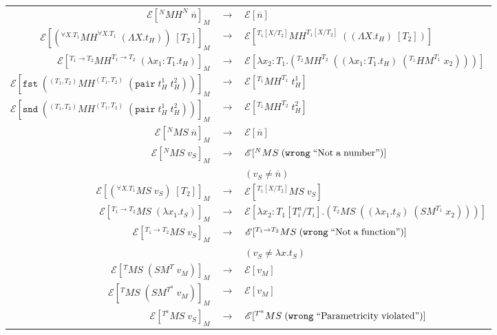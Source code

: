 \begin{figure}
\onehalfspacing
\begin{center}
\begin{tabular}{rcl}
$\mathscr{E}[^{N}MH^{N}\;\overline{n}]_{M}$ & $\rightarrow$ & $\mathscr{E}[\overline{n}]$ \\
$\mathscr{E}[(^{\forall X.T_{1}}MH^{\forall X.T_{1}}\;(\Lambda X.t_{H}))\;[T_{2}]]_{M}$ & $\rightarrow$ & $\mathscr{E}[^{T_{1}[X/T_{2}]}MH^{T_{1}[X/T_{2}]}\;((\Lambda X.t_{H})\;[T_{2}])]$ \\
$\mathscr{E}[^{T_{1}\rightarrow T_{2}}MH^{T_{1}\rightarrow T_{2}}\;(\lambda x_{1}:T_{1}.t_{H})]_{M}$ & $\rightarrow$ & $\mathscr{E}[\lambda x_{2}:T_{1}.(^{T_{2}}MH^{T_{2}}\;((\lambda x_{1}:T_{1}.t_{H})\;(^{T_{1}}HM^{T_{1}}\;x_{2})))]$ \\
$\mathscr{E}[\mathtt{fst}\;(^{(T_{1},T_{2})}MH^{(T_{1},T_{2})}\;(\mathtt{pair}\;t_{H}^{1}\;t_{H}^{2}))]_{M}$ & $\rightarrow$ & $\mathscr{E}[^{T_{1}}MH^{T_{1}}\;t_{H}^{1}]$ \\
$\mathscr{E}[\mathtt{snd}\;(^{(T_{1},T_{2})}MH^{(T_{1},T_{2})}\;(\mathtt{pair}\;t_{H}^{1}\;t_{H}^{2}))]_{M}$ & $\rightarrow$ & $\mathscr{E}[^{T_{1}}MH^{T_{2}}\;t_{H}^{2}]$ \\
$\mathscr{E}[^{N}MS\;\overline{n}]_{M}$ & $\rightarrow$ & $\mathscr{E}[\overline{n}]$ \\
$\mathscr{E}[^{N}MS\;v_{S}]_{M}$ & $\rightarrow$ & $\mathscr{E}[^{N}MS\;(\mathtt{wrong}\;\mathrm{``Not\;a\;number"})]$ \\
&& $(v_{S}\neq\overline{n})$ \\
$\mathscr{E}[(^{\forall X.T_{1}}MS\;v_{S})\;[T_{2}]]_{M}$ & $\rightarrow$ & $\mathscr{E}[^{T_{1}[X/T_{2}]}MS\;v_{S}]$ \\
$\mathscr{E}[^{T_{1}\rightarrow T_{2}}MS\;(\lambda x_{1}.t_{S})]_{M}$ & $\rightarrow$ & $\mathscr{E}[\lambda x_{2}:T_{1}[T^{a}_{i}/T_{i}].(^{T_{2}}MS\;((\lambda x_{1}.t_{S})\;(SM^{T_{1}}\;x_{2})))]$ \\
$\mathscr{E}[^{T_{1}\rightarrow T_{2}}MS\;v_{S}]_{M}$ & $\rightarrow$ & $\mathscr{E}[^{T_{1}\rightarrow T_{2}}MS\;(\mathtt{wrong}\;\mathrm{``Not\;a\;function"})]$ \\
&& $(v_{S}\neq\lambda x.t_{S})$ \\
$\mathscr{E}[^{T}MS\;(SM^{T}\;v_{M})]_{M}$ & $\rightarrow$ & $\mathscr{E}[v_{M}]$ \\
$\mathscr{E}[^{T}MS\;(SM^{T^{a}}\;v_{M})]_{M}$ & $\rightarrow$ & $\mathscr{E}[v_{M}]$ \\
$\mathscr{E}[^{T^{a}}MS\;v_{S}]_{M}$ & $\rightarrow$ & $\mathscr{E}[^{T^{a}}MS\;(\mathtt{wrong}\;\mathrm{``Parametricity\;violated"})]$ \\

\end{tabular}
\end{center}
\end{figure}
